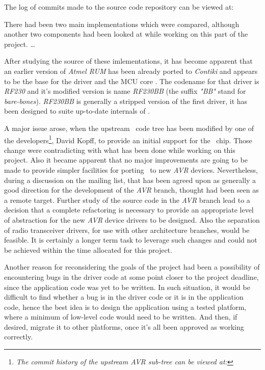   The log of commits made to the source code repository can be viewed at:

\footnotesize
{}
\normalsize

  There had been two main implementations which were compared, although
 another two components had been looked at while working on this part
 of the project. \dots %

  After studying the source of these imlementations, it has become apparent
 that an earlier version of \emph{Atmel RUM} has been already ported to
 \emph{Contiki} and appears to be the base for the  driver
 and the MCU core . The codename for that driver is
 \emph{RF230} and it's modified version is name \emph{RF230BB} (the
 suffix \emph{"BB"} stand for \emph{bare-bones}). \emph{RF230BB} is
 generally a stripped version of the first driver, it has been designed
 to suite up-to-date internals of \ContikiOS.
 

  A major issue arose, when the upstream \Contiki\ code tree has been
 modified by one of the developers\footnote{\emph{The commit history of
 the upstream AVR sub-tree can be viewed at:}
 },
 David Kopff, to provide an initial support for the \RFA\ chip. Those
 change were contradicting with what has been done while working on this
 project. Also it became apparent that no major improvements are going
 to be made to provide simpler facilities for porting \Contiki\ to new
 \emph{AVR} devices.
 Nevertheless, during a discussion on the mailing list, that has been
 agreed upon as generally a good direction for the development of the
 \emph{AVR} branch, thought had been seen as a remote target. Further
 study of the source code in the \emph{AVR} branch lead to a decision
 that a complete refactoring is necessary to provide an appropriate
 level of abstraction for the new \emph{AVR} device drivers to be
 designed. Also the separation of radio transceiver drivers, for use
 with other architecture branches, would be feasible. It is certainly
 a longer term task to leverage such changes and could not be achieved
 within the time allocated for this project.

  Another reason for reconsidering the goals of the project had been
 a possibility of encountering bugs in the driver code at some point
 closer to the project deadline, since the application code was yet to
 be written. In such situation, it would be difficult to find whether
 a bug is in the driver code or it is in the application code, hence
 the best idea is to design the application using a tested platform,
 where a minimum of low-level code would need to be written. And then,
 if desired, migrate it to other platforms, once it's all been approved
 as working correctly.

